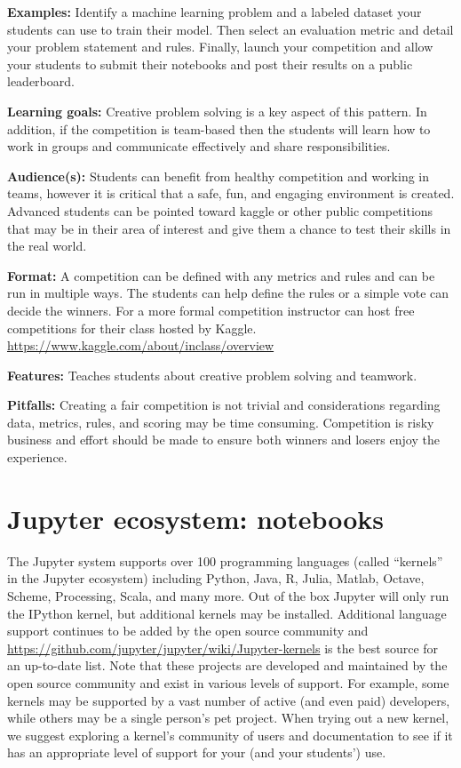 \documentclass[]{book}
\begin{document}
\textbf{Examples:} Identify a machine learning problem and a labeled
dataset your students can use to train their model. Then select an
evaluation metric and detail your problem statement and rules. Finally,
launch your competition and allow your students to submit their
notebooks and post their results on a public leaderboard.

\textbf{Learning goals:} Creative problem solving is a key aspect of
this pattern. In addition, if the competition is team-based then the
students will learn how to work in groups and communicate effectively
and share responsibilities.

\textbf{Audience(s):} Students can benefit from healthy competition and
working in teams, however it is critical that a safe, fun, and engaging
environment is created. Advanced students can be pointed toward kaggle
or other public competitions that may be in their area of interest and
give them a chance to test their skills in the real world.

\textbf{Format:} A competition can be defined with any metrics and rules
and can be run in multiple ways. The students can help define the rules
or a simple vote can decide the winners. For a more formal competition
instructor can host free competitions for their class hosted by Kaggle.
\url{https://www.kaggle.com/about/inclass/overview}

\textbf{Features:} Teaches students about creative problem solving and
teamwork.

\textbf{Pitfalls:} Creating a fair competition is not trivial and
considerations regarding data, metrics, rules, and scoring may be time
consuming. Competition is risky business and effort should be made to
ensure both winners and losers enjoy the experience.

\hypertarget{jupyter}{\chapter{Jupyter ecosystem:
notebooks}\label{jupyter}}

The Jupyter system supports over 100 programming languages (called
``kernels'' in the Jupyter ecosystem) including Python, Java, R, Julia,
Matlab, Octave, Scheme, Processing, Scala, and many more. Out of the box
Jupyter will only run the IPython kernel, but additional kernels may be
installed. Additional language support continues to be added by the open
source community and
\url{https://github.com/jupyter/jupyter/wiki/Jupyter-kernels} is the
best source for an up-to-date list. Note that these projects are
developed and maintained by the open source community and exist in
various levels of support. For example, some kernels may be supported by
a vast number of active (and even paid) developers, while others may be
a single person's pet project. When trying out a new kernel, we suggest
exploring a kernel's community of users and documentation to see if it
has an appropriate level of support for your (and your students') use.
\end{document}
